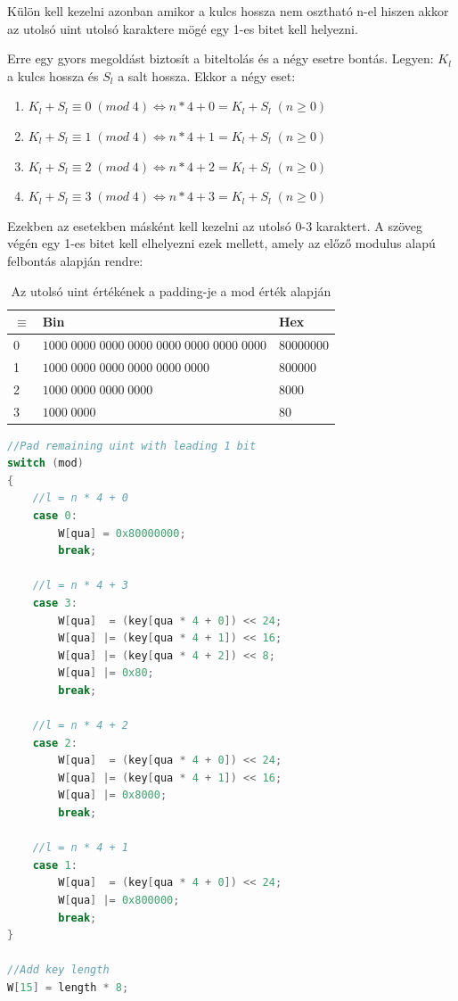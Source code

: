 Külön kell kezelni azonban amikor a kulcs hossza nem osztható n-el hiszen akkor az utolsó uint utolsó karaktere mögé egy 1-es bitet kell helyezni.

Erre egy gyors megoldást biztosít a biteltolás és a négy esetre bontás. Legyen: $K_l$ a kulcs hossza és $S_l$ a salt hossza. Ekkor a négy eset:

\begin{enumerate}
    \item $K_l + S_l \equiv 0 \; (mod \; 4) \iff n * 4 + 0 = K_l + S_l \; (n \geq 0)$
    \item $K_l + S_l \equiv 1 \; (mod \; 4) \iff n * 4 + 1 = K_l + S_l \; (n \geq 0)$
    \item $K_l + S_l \equiv 2 \; (mod \; 4) \iff n * 4 + 2 = K_l + S_l \; (n \geq 0)$
    \item $K_l + S_l \equiv 3 \; (mod \; 4) \iff n * 4 + 3 = K_l + S_l \; (n \geq 0)$
\end{enumerate}

Ezekben az esetekben másként kell kezelni az utolsó 0-3 karaktert. A szöveg végén egy 1-es bitet kell elhelyezni ezek mellett, amely az előző modulus alapú felbontás alapján rendre:

\begin{table}[H]
    \begin{tabular}{l|l|l}
        $\equiv$  & Bin                                              & Hex          \\
          \hline
    0 & $1000\;0000\;0000\;0000\;0000\;0000\;0000\;0000$ & $80000000$ \\
    1 & $1000\;0000\;0000\;0000\;0000\;0000$             & $800000$   \\
    2 & $1000\;0000\;0000\;0000$                         & $8000$     \\
    3 & $1000\;0000$                                     & $80$      
        
    \end{tabular}
    \caption{Az utolsó uint értékének a padding-je a mod érték alapján}
\end{table}


\begin{lstlisting}[language={C++}]
//Pad remaining uint with leading 1 bit
switch (mod)
{
    //l = n * 4 + 0
    case 0:
        W[qua] = 0x80000000;
        break;

    //l = n * 4 + 3
    case 3:
        W[qua]  = (key[qua * 4 + 0]) << 24;
        W[qua] |= (key[qua * 4 + 1]) << 16;
        W[qua] |= (key[qua * 4 + 2]) << 8;
        W[qua] |= 0x80;
        break;

    //l = n * 4 + 2
    case 2:
        W[qua]  = (key[qua * 4 + 0]) << 24;
        W[qua] |= (key[qua * 4 + 1]) << 16;
        W[qua] |= 0x8000;
        break;

    //l = n * 4 + 1
    case 1:
        W[qua]  = (key[qua * 4 + 0]) << 24;
        W[qua] |= 0x800000;
        break;
}

//Add key length
W[15] = length * 8;
\end{lstlisting}

